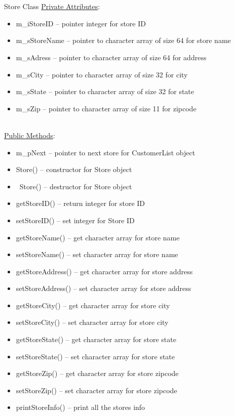 \documentclass[12pt]{article}%
\begin{document}
\hfill\\
\hfill\\
Store Class
\underline{Private Attributes}:
\begin{itemize}
    \item m\_iStoreID -- pointer integer for store ID
    \item m\_sStoreName -- pointer to character array of size 64 for store name
    \item m\_sAdress -- pointer to character array of size 64 for address
    \item m\_sCity -- pointer to character array of size 32 for city
    \item m\_sState -- pointer to character array of size 32 for state
    \item m\_sZip -- pointer to character array of size 11 for zipcode
\end{itemize}
    \hfill\\
\underline{Public Methods}:
\begin{itemize}
    \item m\_pNext -- pointer to next store for CustomerList object
    \item Store() -- constructor for Store object
    \item ~Store() -- destructor for Store object
    \item getStoreID() -- return integer for store ID
    \item setStoreID() -- set integer for Store ID
    \item getStoreName() -- get character array for store name
    \item setStoreName() -- set character array for store name
    \item getStoreAddress() -- get character array for store address
    \item setStoreAddress() -- set character array for store address
    \item getStoreCity() -- get character array for store city
    \item setStoreCity() -- set character array for store city
    \item getStoreState() -- get character array for store state
    \item setStoreState() -- set character array for store state
    \item getStoreZip() -- get character array for store zipcode
    \item setStoreZip() -- set character array for store zipcode
    \item printStoreInfo() -- print all the stores info
\end{itemize}
\end{document}
